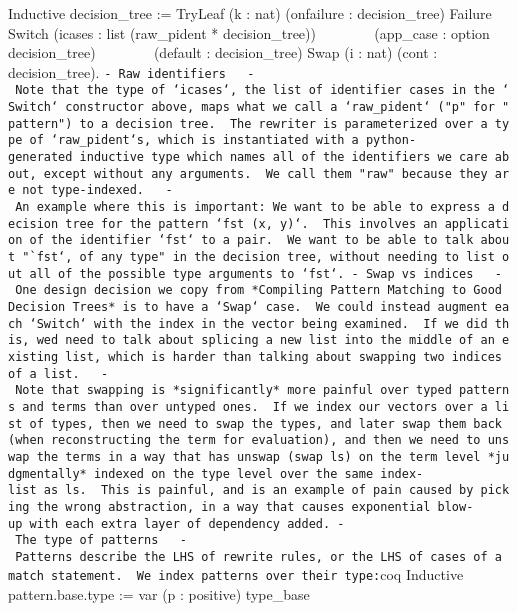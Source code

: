 Inductive decision\_tree := \textbar{} TryLeaf (k : nat) (onfailure :
decision\_tree) \textbar{} Failure \textbar{} Switch (icases : list
(raw\_pident * decision\_tree)) ~ ~ ~ ~ ~(app\_case : option
decision\_tree) ~ ~ ~ ~ ~(default : decision\_tree) \textbar{} Swap (i :
nat) (cont : decision\_tree).
\texttt{-\ Raw\ identifiers\ \ \ -\ Note\ that\ the\ type\ of\ `icases`,\ the\ list\ of\ identifier\ cases\ in\ the\ `Switch`\ constructor\ above,\ maps\ what\ we\ call\ a\ `raw\_pident`\ ("p"\ for\ "pattern")\ to\ a\ decision\ tree.\ \ The\ rewriter\ is\ parameterized\ over\ a\ type\ of\ `raw\_pident`s,\ which\ is\ instantiated\ with\ a\ python-generated\ inductive\ type\ which\ names\ all\ of\ the\ identifiers\ we\ care\ about,\ except\ without\ any\ arguments.\ \ We\ call\ them\ "raw"\ because\ they\ are\ not\ type-indexed.\ \ \ -\ An\ example\ where\ this\ is\ important:\ We\ want\ to\ be\ able\ to\ express\ a\ decision\ tree\ for\ the\ pattern\ `fst\ (x,\ y)`.\ \ This\ involves\ an\ application\ of\ the\ identifier\ `fst`\ to\ a\ pair.\ \ We\ want\ to\ be\ able\ to\ talk\ about\ "`fst`,\ of\ any\ type"\ in\ the\ decision\ tree,\ without\ needing\ to\ list\ out\ all\ of\ the\ possible\ type\ arguments\ to\ `fst`.\ -\ Swap\ vs\ indices\ \ \ -\ One\ design\ decision\ we\ copy\ from\ *Compiling\ Pattern\ Matching\ to\ Good\ Decision\ Trees*\ is\ to\ have\ a\ `Swap`\ case.\ \ We\ could\ instead\ augment\ each\ `Switch`\ with\ the\ index\ in\ the\ vector\ being\ examined.\ \ If\ we\ did\ this,\ we\textquotesingle{}d\ need\ to\ talk\ about\ splicing\ a\ new\ list\ into\ the\ middle\ of\ an\ existing\ list,\ which\ is\ harder\ than\ talking\ about\ swapping\ two\ indices\ of\ a\ list.\ \ \ -\ Note\ that\ swapping\ is\ *significantly*\ more\ painful\ over\ typed\ patterns\ and\ terms\ than\ over\ untyped\ ones.\ \ If\ we\ index\ our\ vectors\ over\ a\ list\ of\ types,\ then\ we\ need\ to\ swap\ the\ types,\ and\ later\ swap\ them\ back\ (when\ reconstructing\ the\ term\ for\ evaluation),\ and\ then\ we\ need\ to\ unswap\ the\ terms\ in\ a\ way\ that\ has\ unswap\ (swap\ ls)\ on\ the\ term\ level\ *judgmentally*\ indexed\ on\ the\ type\ level\ over\ the\ same\ index-list\ as\ ls.\ \ This\ is\ painful,\ and\ is\ an\ example\ of\ pain\ caused\ by\ picking\ the\ wrong\ abstraction,\ in\ a\ way\ that\ causes\ exponential\ blow-up\ with\ each\ extra\ layer\ of\ dependency\ added.\ -\ The\ type\ of\ patterns\ \ \ -\ Patterns\ describe\ the\ LHS\ of\ rewrite\ rules,\ or\ the\ LHS\ of\ cases\ of\ a\ match\ statement.\ \ We\ index\ patterns\ over\ their\ type:}coq
Inductive pattern.base.type := var (p : positive) \textbar{} type\_base
